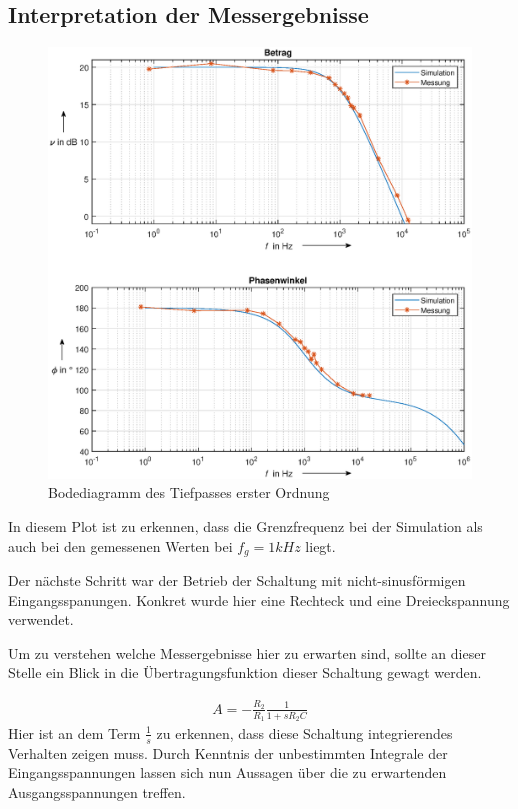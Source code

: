 \subsection{Interpretation der Messergebnisse}
\begin{figure}[H]
    \centering
    \includegraphics[width=\costumPicWidth]{Lab_2/Plots/TP_first_order.eps}
    \caption{Bodediagramm des Tiefpasses erster Ordnung}
    \label{fig:Bode_aktiver_Tiefpass}
\end{figure}

In diesem Plot ist zu erkennen, dass die Grenzfrequenz bei der Simulation als auch bei den gemessenen Werten bei $f_g = 1kHz$ liegt. 

Der nächste Schritt war der Betrieb der Schaltung mit nicht-sinusförmigen Eingangsspanungen. Konkret wurde hier eine Rechteck und eine Dreieckspannung verwendet.

Um zu verstehen welche Messergebnisse hier zu erwarten sind, sollte an dieser Stelle ein Blick in die Übertragungsfunktion dieser Schaltung gewagt werden.

\begin{align}
    A = -\frac{R_2}{R_1}\frac{1}{1+sR_2 C}
\end{align}
Hier ist an dem Term $\frac{1}{s} $ zu erkennen, dass diese Schaltung integrierendes Verhalten zeigen muss. Durch Kenntnis der unbestimmten Integrale der Eingangsspannungen lassen sich nun Aussagen über die zu erwartenden Ausgangsspannungen treffen.
